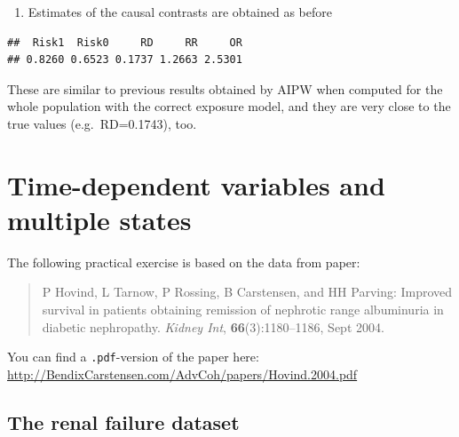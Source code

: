 \documentclass[
]{book}
\newenvironment{Shaded}{\begin{snugshade}}{\end{snugshade}}
\newcommand{\DecValTok}[1]{\textcolor[rgb]{0.00,0.00,0.81}{#1}}
\newcommand{\FunctionTok}[1]{\textcolor[rgb]{0.13,0.29,0.53}{\textbf{#1}}}
\newcommand{\NormalTok}[1]{#1}
\newcommand{\OtherTok}[1]{\textcolor[rgb]{0.56,0.35,0.01}{#1}}
\newcommand{\SpecialCharTok}[1]{\textcolor[rgb]{0.81,0.36,0.00}{\textbf{#1}}}
\providecommand{\tightlist}{%
  \setlength{\itemsep}{0pt}\setlength{\parskip}{0pt}}
\theoremstyle{definition}
\theoremstyle{definition}
\theoremstyle{definition}
\theoremstyle{definition}
\theoremstyle{remark}
\begin{document}
\begin{enumerate}
\def\labelenumi{\arabic{enumi}.}
\setcounter{enumi}{3}
\tightlist
\item
  Estimates of the causal contrasts are obtained as before
\end{enumerate}

\begin{Shaded}
\end{Shaded}

\begin{verbatim}
##  Risk1  Risk0     RD     RR     OR 
## 0.8260 0.6523 0.1737 1.2663 2.5301
\end{verbatim}

These are similar to previous results obtained by AIPW when computed for
the whole population with the correct exposure model, and they are very
close to the true values (e.g.~RD=0.1743), too.

\chapter{Time-dependent variables and multiple states}\label{time-dependent-variables-and-multiple-states}

The following practical exercise is based on the data from paper:

\begin{quote}
P Hovind, L Tarnow, P Rossing, B Carstensen, and HH Parving:
Improved survival in patients obtaining remission of nephrotic range
albuminuria in diabetic nephropathy.
\emph{Kidney Int}, \textbf{66}(3):1180--1186, Sept 2004.
\end{quote}

You can find a \texttt{.pdf}-version of the paper here:
\url{http://BendixCarstensen.com/AdvCoh/papers/Hovind.2004.pdf}

\section{The renal failure dataset}\label{the-renal-failure-dataset}
\end{document}
